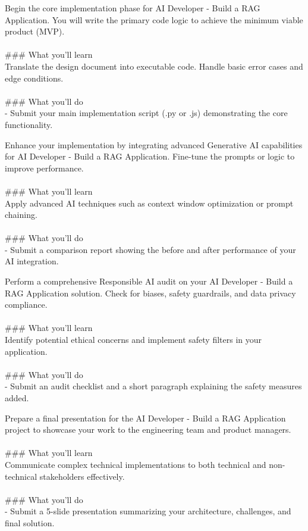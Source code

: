 \documentclass{article}
\begin{document}
Begin the core implementation phase for AI Developer - Build a RAG Application. You will write the primary code logic to achieve the minimum viable product (MVP). \\
 \\
### What you'll learn \\
Translate the design document into executable code. Handle basic error cases and edge conditions. \\
 \\
### What you'll do \\
- Submit your main implementation script (.py or .js) demonstrating the core functionality.

Enhance your implementation by integrating advanced Generative AI capabilities for AI Developer - Build a RAG Application. Fine-tune the prompts or logic to improve performance. \\
 \\
### What you'll learn \\
Apply advanced AI techniques such as context window optimization or prompt chaining. \\
 \\
### What you'll do \\
- Submit a comparison report showing the before and after performance of your AI integration.

Perform a comprehensive Responsible AI audit on your AI Developer - Build a RAG Application solution. Check for biases, safety guardrails, and data privacy compliance. \\
 \\
### What you'll learn \\
Identify potential ethical concerns and implement safety filters in your application. \\
 \\
### What you'll do \\
- Submit an audit checklist and a short paragraph explaining the safety measures added.

Prepare a final presentation for the AI Developer - Build a RAG Application project to showcase your work to the engineering team and product managers. \\
 \\
### What you'll learn \\
Communicate complex technical implementations to both technical and non-technical stakeholders effectively. \\
 \\
### What you'll do \\
- Submit a 5-slide presentation summarizing your architecture, challenges, and final solution.
\end{document}
